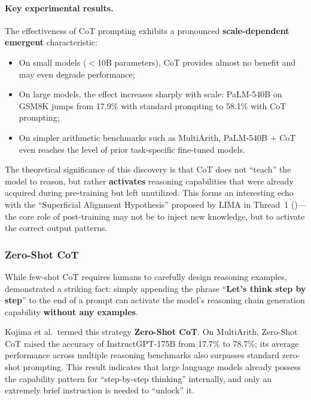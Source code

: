 \paragraph{Key experimental results.}
The effectiveness of CoT prompting exhibits a pronounced \textbf{scale-dependent emergent} characteristic:
\begin{itemize}[leftmargin=2em]
  \item On small models ($<$10B parameters), CoT provides almost no benefit and may even degrade performance;
  \item On large models, the effect increases sharply with scale: PaLM-540B on GSM8K jumps from 17.9\% with standard prompting to 58.1\% with CoT prompting;
  \item On simpler arithmetic benchmarks such as MultiArith, PaLM-540B + CoT even reaches the level of prior task-specific fine-tuned models.
\end{itemize}

\noindent
The theoretical significance of this discovery is that
CoT does not ``teach'' the model to reason, but rather \textbf{activates} reasoning capabilities that were already acquired during pre-training but left unutilized.
This forms an interesting echo with the ``Superficial Alignment Hypothesis'' proposed by LIMA \cite{zhou2023lima} in Thread~1
()---
the core role of post-training may not be to inject new knowledge, but to activate the correct output patterns.

\subsubsection{Zero-Shot CoT}

While few-shot CoT requires humans to carefully design reasoning examples,
 demonstrated a striking fact:
simply appending the phrase ``\textbf{Let's think step by step}'' to the end of a prompt
can activate the model's reasoning chain generation capability \textbf{without any examples}.

Kojima et al.\ termed this strategy \textbf{Zero-Shot CoT}.
On MultiArith, Zero-Shot CoT raised the accuracy of InstructGPT-175B from 17.7\% to 78.7\%;
its average performance across multiple reasoning benchmarks also surpasses standard zero-shot prompting.
This result indicates that large language models already possess the capability pattern for ``step-by-step thinking'' internally,
and only an extremely brief instruction is needed to ``unlock'' it.

